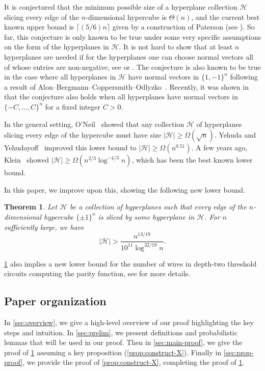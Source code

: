 \documentclass[reqno]{amsart}
\newtheorem{theorem}{Theorem}
\theoremstyle{remark}
\theoremstyle{definition}
\numberwithin{theorem}{section}
\renewcommand{\(}{\bigl(}
\renewcommand{\)}{\bigr)\vphantom{)}}
\newcommand{\cH}{\mathcal H}
\renewcommand{\ge}{\geqslant}
\newcommand{\ceil}[1]{\lceil#1\rceil}
\newcommand{\bin}{\{\pm 1\}}
\begin{document}
It is conjectured that the minimum possible size of a hyperplane collection $\cH$ slicing every edge of the $n$-dimensional hypercube is $\Theta(n)$, and the current best known upper bound is $\ceil{(5/6)n}$ given by a construction of Paterson (see \cite{saks1993}). So far, this conjecture is only known to be true under some very specific assumptions on the form of the hyperplanes in $\cH$. It is not hard to show that at least $n$ hyperplanes are needed if for the hyperplanes one can choose normal vectors all of whose entries are non-negative, see \cite{AHLSWEDE1990137} or \cite{GotsmanLinial94}. The conjecture is also known to be true in the case where all hyperplanes in $\cH$ have normal vectors in $\{1,-1\}^n$ following a result of Alon--Bergmann--Coppersmith--Odlyzko~\cite{alon88balance}. Recently, it was shown in \cite{sauermann2025nondegeneratehyperplanecovershypercube} that the conjecture also holds when all hyperplanes have normal vectors in $\{-C, \dots, C\}^n$ for a fixed integer $C>0$.


In the general setting, O'Neil~\cite{ONeil71} showed that any collection $\cH$ of hyperplanes slicing every edge of the hypercube must have size $|\cH|\ge \Omega(\sqrt{n})$. Yehuda and Yehudayoff~\cite{yehuda2021slicing} improved this lower bound to $|\cH|\ge \Omega(n^{0.51})$. A few years ago, Klein~\cite{klein2022slicing} showed $|\cH|\ge \Omega(n^{2/3}\log^{-4/3}n)$, which has been the best known lower bound.

In this paper, we improve upon this, showing the following new lower bound.

\begin{theorem}\label{thm:main}
    Let $\cH$ be a collection of hyperplanes such that every edge of the $n$-dimensional hypercube $\bin^n$ is sliced by some hyperplane in $\cH$. For $n$ sufficiently large, we have
    \[|\cH| > \frac{n^{13/19}}{10^{11}\log^{32/19}n}.\]
\end{theorem}

\cref{thm:main} also implies a new lower bound for the number of wires in depth-two threshold circuits computing the parity function, see \cite{yehuda2021slicing} for more details.

\subsection{Paper organization} In \cref{sec:overview}, we give a high-level overview of our proof highlighting the key steps and intuition. In \cref{sec:prelim}, we present definitions and probabilistic lemmas that will be used in our proof. Then in \cref{sec:main-proof}, we give the proof of \cref{thm:main} assuming a key proposition (\cref{prop:construct-X}). Finally in \cref{sec:prop-proof}, we provide the proof of \cref{prop:construct-X}, completing the proof of \cref{thm:main}. 
\end{document}
